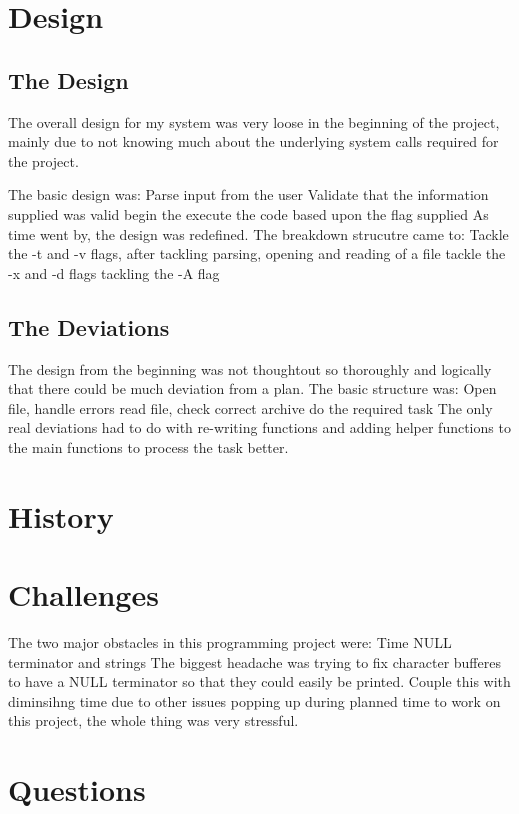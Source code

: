 \documentclass[letterpaper,10pt,titlepage]{article}
\begin{document}
\section{Design}
\label{System Design & Deviations}

\subsection{The Design}
\label{DesingProcess}
The overall design for my system was very loose in the beginning of the project, mainly due to not knowing much about the
underlying system calls required for the project.

The basic design was:
	Parse input from the user
	Validate that the information supplied was valid
	begin the execute the code based upon the flag supplied
As time went by, the design was redefined. The breakdown strucutre came to:
	Tackle the -t and -v flags, after tackling parsing, opening and reading of a file
	tackle the -x and -d flags
	tackling the -A flag
\subsection{The Deviations}
\label{Deviations}
The design from the beginning was not thoughtout so thoroughly and logically that there could be much deviation from a plan. The basic structure was:
	Open file, handle errors
	read file, check correct archive
	do the required task
The only real deviations had to do with re-writing functions and adding helper functions to the main functions to process the task better.
\section{History}
\label{myar Revision History}
%

\section{Challenges}
\label{Overcoming Project challenges}
The two major obstacles in this programming project were:
	Time
	NULL terminator and strings
The biggest headache was trying to fix character bufferes to have a NULL terminator so that they could easily be printed. Couple this with diminsihng time due to other issues popping up during planned time to work on this project, the whole thing was very stressful.

\section{Questions}
\label{Project Quesions}
\end{document}
